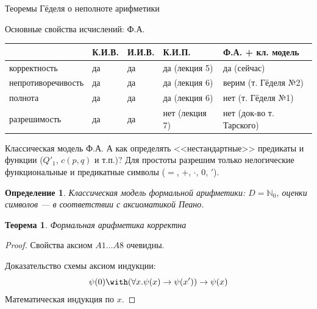 \documentclass[aspectratio=169]{beamer}
\newtheorem{thm}{Теорема}[section]
\newtheorem{dfn}{Определение}[section]
\begin{document}
\begin{frame}{}
\LARGE\begin{center}Теоремы Гёделя о неполноте арифметики\end{center}
\end{frame}

\begin{frame}{Основные свойства исчислений: Ф.А.}
\begin{tabular}{lllll}
      & К.И.В. & И.И.В. & К.И.П. & Ф.А. + кл. модель\\\hline
корректность & да  & да  & да (лекция 5) & да (сейчас)\\
непротиворечивость & да  & да  & да (лекция 6) & {\color{red}верим} (т. Гёделя №2)\\
полнота & да & да & да (лекция 6) & {\color{red}нет} (т. Гёделя №1)\\
разрешимость & да  & да & нет (лекция 7)& {\color{red}нет} (док-во т. Тарского)
\end{tabular}
\end{frame}

\begin{frame}{Классическая модель Ф.А.}
А как определять <<нестандартные>> предикаты и функции ($Q'_1$, $c(p,q)$ и т.п.)? \pause
Для простоты разрешим только нелогические функциональные и предикатные символы ($=$, $+$, $\cdot$, 0, $'$).\pause
\begin{dfn}Классическая модель формальной арифметики: $D = \mathbb{N}_0$, оценки символов --- в соответствии
с аксиоматикой Пеано.
\end{dfn}

\begin{thm}Формальная арифметика корректна\end{thm}
\begin{proof}Свойства аксиом $A1\dots A8$ очевидны. 

Доказательство схемы аксиом индукции:
$$\psi(0) \with (\forall x.\psi(x) \rightarrow \psi(x')) \rightarrow \psi(x)$$
Математическая индукция по $x$.
\end{proof}
\end{frame}
\end{document}
